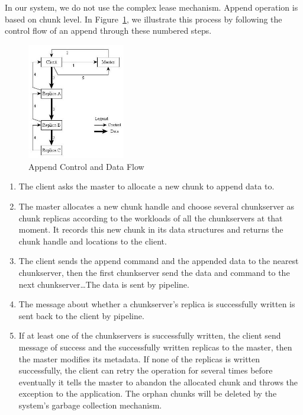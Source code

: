 \documentclass[letterpaper,twocolumn,10pt]{article}
\begin{document}
In our system, we do not use the complex lease mechanism. Append operation is based on chunk level. In Figure~\ref{fig:tfswrite}, we illustrate this process by following the control flow of an append through these numbered steps.
\begin{figure}[t]
\begin{center}
\includegraphics[width=0.38\textwidth]{tfs_write}
\end{center}
\caption{Append Control and Data Flow}
\label{fig:tfswrite}
\end{figure}
\begin{enumerate}
\item The client asks the master to allocate a new chunk to append data to.
\item The master allocates a new chunk handle and choose several chunkserver as chunk replicas according to the workloads of all the chunkservers at that moment. It records this new chunk in its data structures and returns the chunk handle and locations to the client.
\item The client sends the append command and the appended data to the nearest chunkserver, then the first chunkserver send the data and command to the next chunkserver\ldots The data is sent by pipeline. 
\item The message about whether a chunkserver's replica is successfully written is sent back to the client by pipeline. 
\item If at least one of the chunkservers is successfully written, the client send message of success and the successfully written replicas to the master, then the master modifies its metadata. If none of the replicas is written successfully, the client can retry the operation for several times before eventually it tells the master to abandon the allocated chunk and throws the exception to the application. The orphan chunks will be deleted by the system's garbage collection mechanism. 
\end{enumerate}
\end{document}
